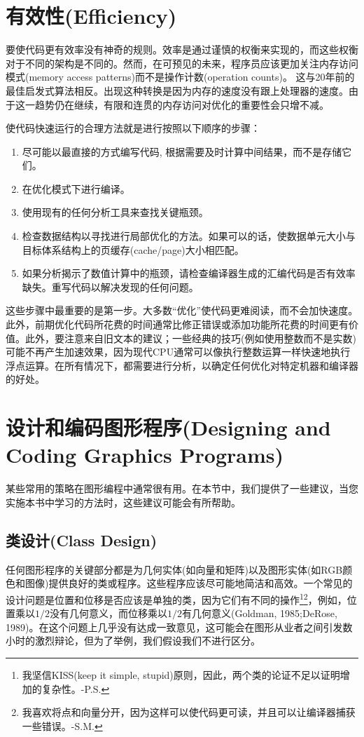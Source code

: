 \section{有效性(Efficiency)} 

要使代码更有效率没有神奇的规则。效率是通过谨慎的权衡来实现的，而这些权衡对于不同的架构是不同的。然而，在可预见的未来，程序员应该更加关注内存访问模式(memory access patterns)而不是操作计数(operation counts)。
这与20年前的最佳启发式算法相反。出现这种转换是因为内存的速度没有跟上处理器的速度。由于这一趋势仍在继续，有限和连贯的内存访问对优化的重要性会只增不减。

使代码快速运行的合理方法就是进行按照以下顺序的步骤：
\begin{enumerate}
	\item 尽可能以最直接的方式编写代码, 根据需要及时计算中间结果，而不是存储它们。
	\item 在优化模式下进行编译。
	\item 使用现有的任何分析工具来查找关键瓶颈。
	\item 检查数据结构以寻找进行局部优化的方法。如果可以的话，使数据单元大小与目标体系结构上的页缓存(cache/page)大小相匹配。
	\item 如果分析揭示了数值计算中的瓶颈，请检查编译器生成的汇编代码是否有效率缺失。重写代码以解决发现的任何问题。
\end{enumerate}

这些步骤中最重要的是第一步。大多数“优化”使代码更难阅读，而不会加快速度。此外，前期优化代码所花费的时间通常比修正错误或添加功能所花费的时间更有价值。此外，要注意来自旧文本的建议；一些经典的技巧(例如使用整数而不是实数)可能不再产生加速效果，因为现代CPU通常可以像执行整数运算一样快速地执行浮点运算。在所有情况下，都需要进行分析，以确定任何优化对特定机器和编译器的好处。

\section{设计和编码图形程序(Designing and Coding Graphics Programs)}

某些常用的策略在图形编程中通常很有用。在本节中，我们提供了一些建议，当您实施本书中学习的方法时，这些建议可能会有所帮助。

\subsection{类设计(Class Design)}

任何图形程序的关键部分都是为几何实体(如向量和矩阵)以及图形实体(如RGB颜色和图像)提供良好的类或程序。这些程序应该尽可能地简洁和高效。一个常见的设计问题是位置和位移是否应该是单独的类，因为它们有不同的操作\footnote{我坚信KISS(keep it simple, stupid)原则，因此，两个类的论证不足以证明增加的复杂性。-P.S.}\footnote{我喜欢将点和向量分开，因为这样可以使代码更可读，并且可以让编译器捕获一些错误。-S.M.}，例如，位置乘以$1/2$没有几何意义，而位移乘以$1/2$有几何意义(Goldman, 1985;DeRose, 1989)。在这个问题上几乎没有达成一致意见，这可能会在图形从业者之间引发数小时的激烈辩论，但为了举例，我们假设我们不进行区分。

